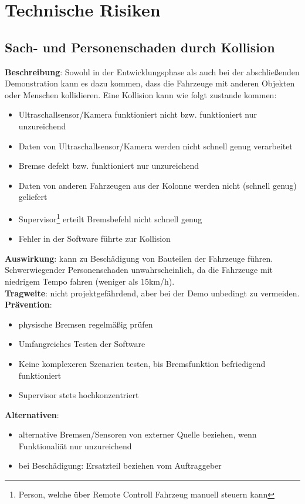 \documentclass[a4paper, 12pt, titlepage]{scrartcl}
\begin{document}
	
\newpage
\section{Technische Risiken}
	\subsection{Sach- und Personenschaden durch Kollision}
		\textbf{Beschreibung}: Sowohl in der Entwicklungsphase als auch bei der abschlie\ss enden Demonstration kann es dazu kommen, dass die Fahrzeuge mit anderen Objekten oder Menschen kollidieren. Eine Kollision kann wie folgt zustande kommen: 
			\begin{itemize}
				\item Ultraschallsensor/Kamera funktioniert nicht bzw. funktioniert nur unzureichend
				\item Daten von Ultraschallsensor/Kamera werden nicht schnell genug verarbeitet
				\item Bremse defekt bzw. funktioniert nur unzureichend
				\item Daten von anderen Fahrzeugen aus der Kolonne werden nicht (schnell genug) geliefert
				\item Supervisor\footnote{Person, welche \"uber Remote Controll Fahrzeug manuell steuern kann} erteilt Bremsbefehl nicht schnell genug
				\item Fehler in der Software f\"uhrte zur Kollision
			\end{itemize}
		\textbf{Auswirkung}: kann zu Besch\"adigung von Bauteilen der Fahrzeuge f\"uhren. Schwerwiegender Personenschaden unwahrscheinlich, da die Fahrzeuge mit niedrigem Tempo fahren (weniger als 15km/h).\\
		\textbf{Tragweite}: nicht projektgef\"ahrdend, aber bei der Demo unbedingt zu vermeiden.\\
		\textbf{Pr\"avention}:
			\begin{itemize}
				\item physische Bremsen regelm\"a\ss ig pr\"ufen
				\item Umfangreiches Testen der Software
				\item Keine komplexeren Szenarien testen, bis Bremsfunktion befriedigend funktioniert
				\item Supervisor stets hochkonzentriert 
			\end{itemize}
		\textbf{Alternativen}: 
			\begin{itemize}
				\item alternative Bremsen/Sensoren von externer Quelle beziehen, wenn Funktionali\"at nur unzureichend
				\item bei Besch\"adigung: Ersatzteil beziehen vom Auftraggeber
			\end{itemize}
		
\end{document}
